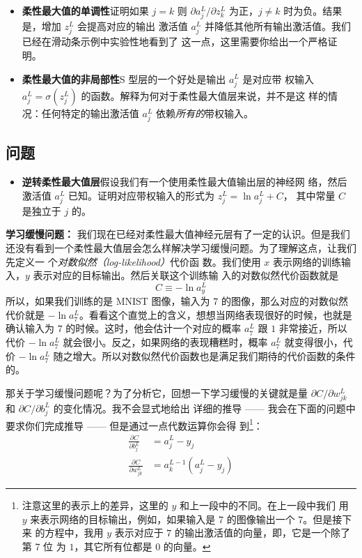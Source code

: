\begin{itemize}
\item \textbf{柔性最大值的单调性}\quad 证明如果 $j=k$ 则 $\partial a^L_j /
  \partial z^L_k$ 为正，$j \neq k$ 时为负。结果是，增加 $z^L_j$ 会提高对应的输出
  激活值 $a^L_j$ 并降低其他所有输出激活值。我们已经在滑动条示例中实验性地看到了
  这一点，这里需要你给出一个严格证明。
\item \textbf{柔性最大值的非局部性}\quad S 型层的一个好处是输出 $a^L_j$ 是对应带
  权输入 $a^L_j = \sigma(z^L_j)$ 的函数。解释为何对于柔性最大值层来说，并不是这
  样的情况：任何特定的输出激活值 $a^L_j$ 依赖\emph{所有的}带权输入。
\end{itemize}

\subsection*{问题}

\begin{itemize}
\item \textbf{逆转柔性最大值层}\quad 假设我们有一个使用柔性最大值输出层的神经网
  络，然后激活值 $a^L_j$ 已知。证明对应带权输入的形式为 $z^L_j = \ln a^L_j + C$，
  其中常量 $C$ 是独立于 $j$ 的。
\end{itemize}

\textbf{学习缓慢问题：} 我们现在已经对柔性最大值神经元层有了一定的认识。但是我们
还没有看到一个柔性最大值层会怎么样解决学习缓慢问题。为了理解这点，让我们先定义一
个\emph{对数似然（log-likelihood）}代价函
数。我们使用 $x$ 表示网络的训练输入，$y$ 表示对应的目标输出。然后关联这个训练输
入的对数似然代价函数就是
\begin{equation}
  C \equiv -\ln a^L_y
  \label{eq:80}\tag{80}
\end{equation}
所以，如果我们训练的是 MNIST 图像，输入为 $7$ 的图像，那么对应的对数似然代价就是
$-\ln a_7^L$。看看这个直觉上的含义，想想当网络表现很好的时候，也就是确认输入为
$7$ 的时候。这时，他会估计一个对应的概率 $a_7^L$ 跟 $1$ 非常接近，所以代价 $-\ln
a_7^L$ 就会很小。反之，如果网络的表现糟糕时，概率 $a_7^L$ 就变得很小，代价 $-\ln
a_7^L$ 随之增大。所以对数似然代价函数也是满足我们期待的代价函数的条件的。

那关于学习缓慢问题呢？为了分析它，回想一下学习缓慢的关键就是量 $\partial C /
\partial w^L_{jk}$ 和 $\partial C / \partial b^L_j$ 的变化情况。我不会显式地给出
详细的推导 —— 我会在下面的问题中要求你们完成推导 —— 但是通过一点代数运算你会得
到\footnote{注意这里的表示上的差异，这里的 $y$ 和上一段中的不同。在上一段中我们
  用 $y$ 来表示网络的目标输出，例如，如果输入是 7 的图像输出一个 $7$。但是接下来
  的方程中，我用 $y$ 表示对应于 $7$ 的输出激活值的向量，即，它是一个除了第 7 位
  为 $1$，其它所有位都是 $0$ 的向量。}：
\begin{align}
  \frac{\partial C}{\partial b^L_j} &= a^L_j-y_j \label{eq:81}\tag{81}\\
  \frac{\partial C}{\partial w^L_{jk}} &= a^{L-1}_k (a^L_j-y_j) \label{eq:82}\tag{82}
\end{align}


